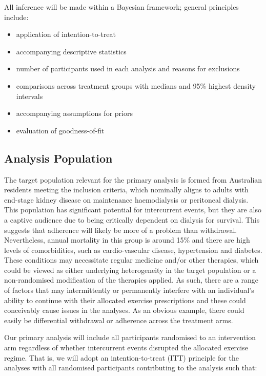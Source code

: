 \documentclass[
]{article}
\begin{document}
All inference will be made within a Bayesian framework; general principles include:

\begin{itemize}
  \item application of intention-to-treat
  \item accompanying descriptive statistics
  \item number of participants used in each analysis and reasons for exclusions
  \item comparisons across treatment groups with medians and 95\% highest density intervals
  \item accompanying assumptions for priors
  \item evaluation of goodness-of-fit
\end{itemize}

\hypertarget{analysis-population}{%
  \subsection{Analysis Population}\label{analysis-population}}

The target population relevant for the primary analysis is formed from Australian residents meeting the inclusion criteria, which nominally aligns to adults with end-stage kidney disease on  maintenance haemodialysis or peritoneal dialysis.
This population has significant potential for intercurrent events, but they are also a captive audience due to being critically dependent on dialysis for survival.
This suggests that adherence will likely be more of a problem than withdrawal.
Nevertheless, annual mortality in this group is around 15\% and there are high levels of  comorbidities, such as cardio-vascular disease, hypertension and diabetes.
These conditions may necessitate regular medicine and/or other therapies, which could be viewed as either underlying heterogeneity in the target population or a non-randomised modification of the therapies applied.
As such, there are a range of factors that may intermittently or permanently interfere with an individual's ability to continue with their allocated exercise prescriptions and these could conceivably cause issues in the analyses.
As an obvious example, there could easily be differential withdrawal or adherence across the treatment arms.

Our primary analysis will include all participants randomised to an intervention arm regardless of whether intercurrent events disrupted the allocated exercise regime.
That is, we will adopt an intention-to-treat (ITT) principle for the analyses with all randomised participants contributing to the analysis such that:
\end{document}
